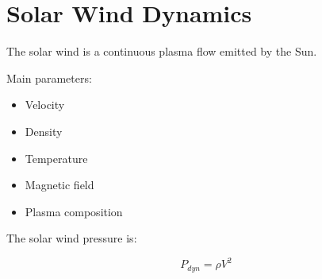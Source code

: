 \section{Solar Wind Dynamics}


The solar wind is a continuous plasma flow emitted by the Sun.



Main parameters:


\begin{itemize}

\item Velocity

\item Density

\item Temperature

\item Magnetic field

\item Plasma composition

\end{itemize}



The solar wind pressure is:


\begin{equation}
P_{dyn}
=
\rho V^2
\end{equation}

